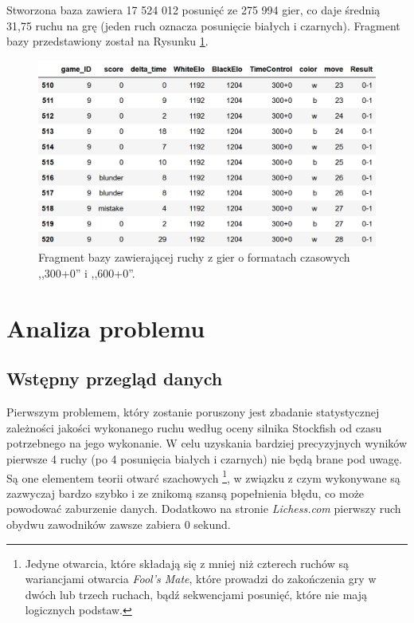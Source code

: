 \documentclass[inzynierska]{pwr_wmat_praca_dyplomowa}
\theoremstyle{plain}
\numberwithin{theorem}{chapter}
\theoremstyle{definition}
\numberwithin{theorem}{chapter}
\begin{document}
Stworzona baza zawiera 17 524 012 posunięć ze 275 994 gier, co daje średnią 31,75 ruchu na grę (jeden ruch oznacza posunięcie białych i czarnych). Fragment bazy przedstawiony został na Rysunku \ref{rys:baza_ruchow}. 
\begin{figure}[H]
	\centering
	\includegraphics[width=\textwidth]{danee.png}
	\caption{Fragment bazy zawierającej ruchy z gier o formatach czasowych ,,300+0'' i ,,600+0''.}
	\label{rys:baza_ruchow}
\end{figure}




\section{Analiza problemu}

\subsection{Wstępny przegląd danych}



Pierwszym problemem, który zostanie poruszony jest zbadanie statystycznej zależności jakości wykonanego ruchu według oceny silnika Stockfish od czasu potrzebnego na jego wykonanie. W celu uzyskania bardziej precyzyjnych wyników pierwsze 4 ruchy (po 4 posunięcia białych i czarnych) nie będą brane pod uwagę. Są one elementem teorii otwarć szachowych \footnote{ Jedyne otwarcia, które składają się z mniej niż czterech ruchów są wariancjami otwarcia \textit{Fool's Mate}, które prowadzi do zakończenia gry w dwóch lub trzech ruchach, bądź sekwencjami posunięć, które nie mają logicznych podstaw.}, w związku z czym wykonywane są zazwyczaj bardzo szybko i ze znikomą szansą popełnienia błędu, co może powodować zaburzenie danych. Dodatkowo na stronie \textit{Lichess.com} pierwszy ruch obydwu zawodników zawsze zabiera 0 sekund.
\end{document}
